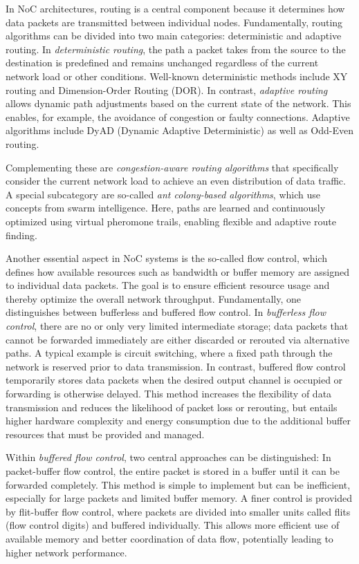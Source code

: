 In NoC architectures, routing is a central component because it determines how data packets are transmitted between individual nodes. Fundamentally, routing algorithms can be divided into two main categories: deterministic and adaptive routing. In \textit{deterministic routing}, the path a packet takes from the source to the destination is predefined and remains unchanged regardless of the current network load or other conditions. Well-known deterministic methods include XY routing and Dimension-Order Routing (DOR). In contrast, \textit{adaptive routing} allows dynamic path adjustments based on the current state of the network. This enables, for example, the avoidance of congestion or faulty connections. Adaptive algorithms include DyAD (Dynamic Adaptive Deterministic) as well as Odd-Even routing.

Complementing these are \textit{congestion-aware routing algorithms} that specifically consider the current network load to achieve an even distribution of data traffic. A special subcategory are so-called \textit{ant colony-based algorithms}, which use concepts from swarm intelligence. Here, paths are learned and continuously optimized using virtual pheromone trails, enabling flexible and adaptive route finding.

Another essential aspect in NoC systems is the so-called flow control, which defines how available resources such as bandwidth or buffer memory are assigned to individual data packets. The goal is to ensure efficient resource usage and thereby optimize the overall network throughput. Fundamentally, one distinguishes between bufferless and buffered flow control. In \textit{bufferless flow control}, there are no or only very limited intermediate storage; data packets that cannot be forwarded immediately are either discarded or rerouted via alternative paths. A typical example is circuit switching, where a fixed path through the network is reserved prior to data transmission. In contrast, buffered flow control temporarily stores data packets when the desired output channel is occupied or forwarding is otherwise delayed. This method increases the flexibility of data transmission and reduces the likelihood of packet loss or rerouting, but entails higher hardware complexity and energy consumption due to the additional buffer resources that must be provided and managed.

Within \textit{buffered flow control}, two central approaches can be distinguished: In packet-buffer flow control, the entire packet is stored in a buffer until it can be forwarded completely. This method is simple to implement but can be inefficient, especially for large packets and limited buffer memory. A finer control is provided by flit-buffer flow control, where packets are divided into smaller units called flits (flow control digits) and buffered individually. This allows more efficient use of available memory and better coordination of data flow, potentially leading to higher network performance.

